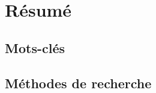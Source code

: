\chapter*{R\'{e}sum\'{e}}
\thispagestyle{empty} %


\section*{Mots-cl\'{e}s}


\section*{M\'{e}thodes de recherche}


